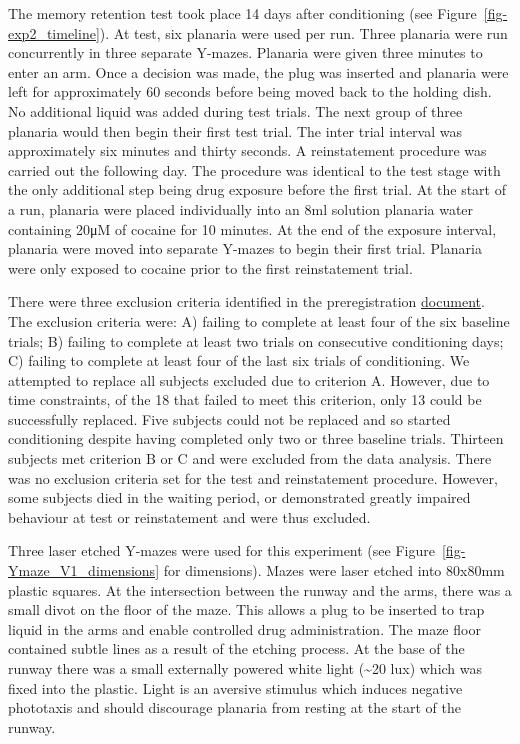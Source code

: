 \documentclass[
  jou,
  floatsintext,
  longtable,
  nolmodern,
  notxfonts,
  notimes,
  donotrepeattitle,
  colorlinks=true,linkcolor=blue,citecolor=blue,urlcolor=blue]{apa7}
\begin{document}
The memory retention test took place 14 days after conditioning (see
Figure~\ref{fig-exp2_timeline}). At test, six planaria were used per
run. Three planaria were run concurrently in three separate Y-mazes.
Planaria were given three minutes to enter an arm. Once a decision was
made, the plug was inserted and planaria were left for approximately 60
seconds before being moved back to the holding dish. No additional
liquid was added during test trials. The next group of three planaria
would then begin their first test trial. The inter trial interval was
approximately six minutes and thirty seconds. A reinstatement procedure
was carried out the following day. The procedure was identical to the
test stage with the only additional step being drug exposure before the
first trial. At the start of a run, planaria were placed individually
into an 8ml solution planaria water containing 20μM of cocaine for 10
minutes. At the end of the exposure interval, planaria were moved into
separate Y-mazes to begin their first trial. Planaria were only exposed
to cocaine prior to the first reinstatement trial.

There were three exclusion criteria identified in the preregistration
\href{https://osf.io/skfnv?view_only=9c794dd942fb4a54b6a986c0a893fe46}{document}.
The exclusion criteria were: A) failing to complete at least four of the
six baseline trials; B) failing to complete at least two trials on
consecutive conditioning days; C) failing to complete at least four of
the last six trials of conditioning. We attempted to replace all
subjects excluded due to criterion A. However, due to time constraints,
of the 18 that failed to meet this criterion, only 13 could be
successfully replaced. Five subjects could not be replaced and so
started conditioning despite having completed only two or three baseline
trials. Thirteen subjects met criterion B or C and were excluded from
the data analysis. There was no exclusion criteria set for the test and
reinstatement procedure. However, some subjects died in the waiting
period, or demonstrated greatly impaired behaviour at test or
reinstatement and were thus excluded.

Three laser etched Y-mazes were used for this experiment (see
Figure~\ref{fig-Ymaze_V1_dimensions} for dimensions). Mazes were laser
etched into 80x80mm plastic squares. At the intersection between the
runway and the arms, there was a small divot on the floor of the maze.
This allows a plug to be inserted to trap liquid in the arms and enable
controlled drug administration. The maze floor contained subtle lines as
a result of the etching process. At the base of the runway there was a
small externally powered white light (\textasciitilde20 lux) which was
fixed into the plastic. Light is an aversive stimulus which induces
negative phototaxis and should discourage planaria from resting at the
start of the runway.
\end{document}
